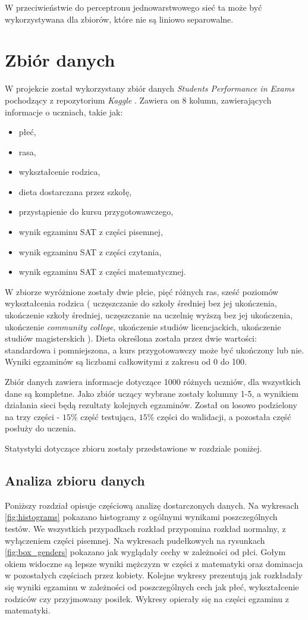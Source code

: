 \documentclass[12pt]{article}
\begin{document}
W przeciwieństwie do perceptronu jednowarstwowego sieć ta może być wykorzystywana dla zbiorów, które nie są liniowo separowalne.


\pagebreak
\section{Zbiór danych}
W projekcie został wykorzystany zbiór danych \textit{Students Performance in Exams} \cite{kaggle-student} pochodzący z repozytorium \textit{Kaggle} \cite{kaggle}. Zawiera on 8 kolumn, zawierających informacje o uczniach, takie jak:
\begin{itemize}
\item płeć,
\item rasa,
\item wykształcenie rodzica,
\item dieta dostarczana przez szkołę,
\item przystąpienie do kursu przygotowawczego,
\item wynik egzaminu SAT z części pisemnej,
\item wynik egzaminu SAT z części czytania,
\item wynik egzaminu SAT z części matematycznej.
\end{itemize}

W zbiorze wyróżnione zostały dwie płcie, pięć różnych ras, sześć poziomów wykształcenia rodzica ( uczęszczanie do szkoły średniej bez jej ukończenia, ukończenie szkoły średniej, uczęszczanie na uczelnię wyższą bez jej ukończenia, ukończenie \textit{community college}, ukończenie studiów licencjackich, ukończenie studiów magisterskich ). Dieta określona została przez dwie wartości: standardowa i pomniejszona, a kurs przygotowawczy może być ukończony lub nie. Wyniki egzaminów są liczbami całkowitymi z zakresu od 0 do 100.

Zbiór danych zawiera informacje dotyczące 1000 różnych uczniów, dla wszystkich dane są kompletne. Jako zbiór uczący wybrane zostały kolumny 1-5, a wynikiem działania sieci będą rezultaty kolejnych egzaminów. Został on losowo podzielony na trzy części - $15\%$ część testująca, $15\%$ części do walidacji, a pozostała część posłuży do uczenia.

Statystyki dotyczące zbioru zostały przedstawione w rozdziale poniżej.

\subsection{Analiza zbioru danych}
Poniższy rozdział opisuje częściową analizę dostarczonych danych. Na wykresach \ref{fig:histograms} pokazano histogramy z ogólnymi wynikami poszczególnych testów. We wszystkich przypadkach rozkład przypomina rozkład normalny, z wyłączeniem części pisemnej. Na wykresach pudełkowych na rysunkach \ref{fig:box_genders} pokazano jak wyglądały cechy w zależności od płci. Gołym okiem widoczne są lepsze wyniki mężczyzn w części z matematyki oraz dominacja w pozostałych częściach przez kobiety. Kolejne wykresy prezentują jak rozkładały się wyniki egzaminu w zależności od poszczególnych cech jak płeć, wykształcenie rodziców czy przyjmowany posiłek. Wykresy opierały się na części egzaminu z matematyki.
\end{document}
